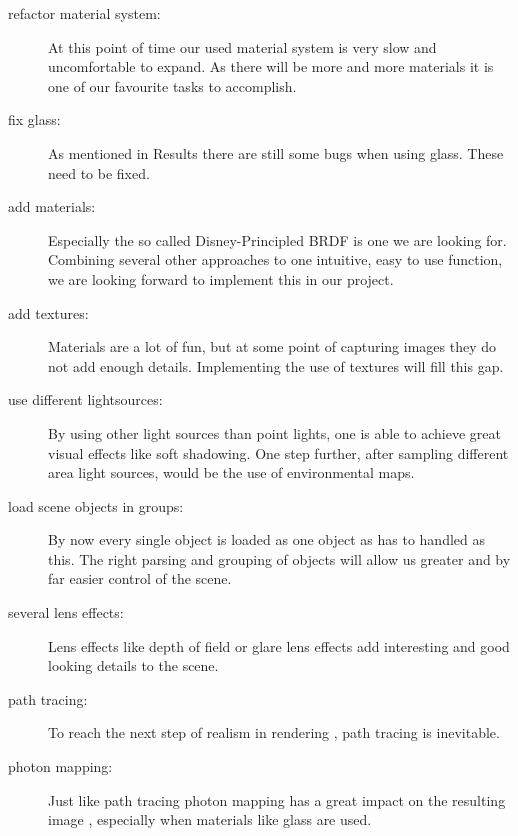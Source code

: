 \documentclass[11pt,a4paper]{article}
\begin{document}
\begin{description}
\item[refactor material system:] At this point of time our used material system is very slow and uncomfortable to expand. As there will be more and more materials it is one of our favourite tasks to accomplish.

\item[fix glass:] As mentioned in Results there are still some bugs when using glass. These need to be fixed.

\item[add materials:]Especially the so called Disney-Principled BRDF is one we are looking for. Combining several other approaches to one intuitive, easy to use function, we are looking forward to implement this in our project.

\item[add textures:]Materials are a lot of fun, but at some point of capturing images they do not add enough details. Implementing the use of textures will fill this gap.

\item[use different lightsources:]By using other light sources than point lights, one is able to achieve great visual effects like soft shadowing. One step further, after sampling different area light sources, would be the use of environmental maps.

\item[load scene objects in groups:] By now every single object is loaded as one object as has to handled as this. The right parsing and grouping of objects will allow us greater and by far easier control of the scene.

\item[several lens effects:]Lens effects like depth of field or glare lens effects add interesting and good looking details to the scene.

\item[path tracing:]To reach the next step of realism in rendering , path tracing is inevitable.

\item[photon mapping:]Just like path tracing photon mapping has a great impact on the resulting image , especially when materials like glass are used.

\end{description}

\newpage
{}


\end{document}
